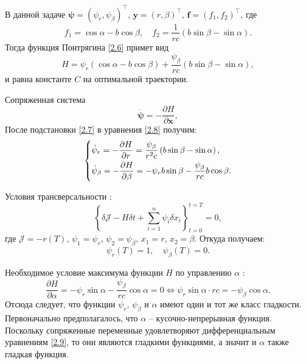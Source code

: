 \documentclass[a4paper,12pt, openany]{book}
\theoremstyle{plain} %
\theoremstyle{definition} %
\theoremstyle{remark} %
\numberwithin{equation}{chapter}
\begin{document}
{В данной задаче $
\bm{\psi}  = \left( {\psi _r ,\psi _\beta  } \right)^\top
$, $\bm{y} = (r,\beta)^\top$, $
\bm{f}  = \left( {f _1 ,f _2 } \right)^\top
$, где $$
f _1   = \cos \alpha  - b\cos \beta, \quad f_2  = \frac{1}{{rc}}\left( {b\sin \beta  - \sin \alpha } \right).
$$
Тогда функция Понтрягина \eqref{2.6} примет вид
\begin{equation}\label{2.7}
H = \psi _r \left( {\cos \alpha  - b\cos \beta } \right) + \frac{{\psi _\beta  }}{{rc}}\left( {b\sin \beta  - \sin \alpha } \right),
\end{equation}
и равна константе $C$ на оптимальной траектории. 

Сопряженная система
\begin{equation}\label{2.8}
\bm{\dot \psi}  =  - \frac{{\partial H}}
{{\partial \bm{x}}},
\end{equation}
После подстановки \eqref{2.7} в уравнения \eqref{2.8} получим:
\begin{equation} \label{2.9}
\left\{ {\begin{aligned}
   & \dot \psi _r  =  - \frac{{\partial H}}{{\partial r}} = \frac{{\psi _\beta  }}{{r^2 c}}\left( {b\sin \beta  - \sin \alpha } \right), \hfill  \\
  & \dot \psi _\beta   =  - \frac{{\partial H}}{{\partial \beta }} =  - \psi _r b\sin \beta  - \frac{{\psi _\beta  }}{{rc}}b\cos \beta . \hfill  \\
\end{aligned}} \right.
\end{equation}

Условия трансверсальности \cite{Letov}:
\[
\left\{ {\delta \mathcal{J} - H\delta t + \sum\limits_{i = 1}^n {\psi _i \delta x_i } } \right\}_{t = 0}^{t = T}  = 0,
\]
где $\mathcal{J} = -r(T), \,\psi_1 = \psi_r, \, \psi_2 = \psi_{\beta}, \, x_1 = r, \, x_2 = \beta$. Откуда получаем:
\begin{equation}\label{2.10}
\psi_r(T) = 1, \quad \psi_{\beta}(T) = 0.
\end{equation}

Необходимое условие максимума функции $H$ по управлению $\alpha$ :
\begin{equation} \label{2.11}
\frac{{\partial H}}{{\partial \alpha }} =  - \psi _r \sin \alpha  - \frac{{\psi _\beta  }}{{rc}}\cos \alpha  = 0 \Longleftrightarrow \psi _r \sin \alpha  \cdot rc =  - \psi _\beta  \cos \alpha .
	\end{equation}	
Отсюда следует, что функции $\psi_r, \, \psi_\beta$ и $\alpha$ имеют один и тот же класс гладкости. Первоначально предполагалось, что $\alpha$ -- кусочно-непрерывная функция. Поскольку сопряженные переменные удовлетворяют дифференциальным уравнениям \eqref{2.9}, то они являются гладкими функциями, а значит и $\alpha$ также гладкая функция. 

}
\end{document}
